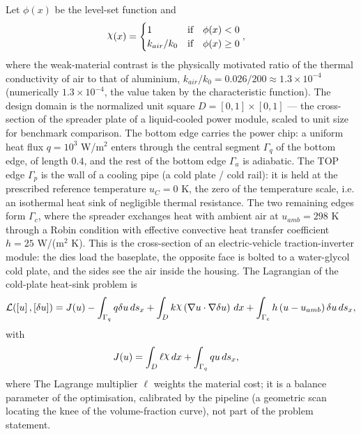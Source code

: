 \documentclass[preview]{standalone}
\let\oldcdot\cdot
\let\cdot\oldcdot
\begin{document}
Let $\phi(x)$ be the level-set function and
 \begin{align*}\raisebox{\depth}{$\chi$}(x) &= \begin{cases} 1 & \mbox{if}\quad \phi(x) < 0 \\ k_{air}/k_0 & \mbox{if}\quad \phi(x)  \ge 0 \end{cases},\end{align*}
where the weak-material contrast is the physically motivated ratio of the thermal conductivity of air to that of aluminium, $k_{air}/k_0 = 0.026/200 \approx 1.3 \times 10^{-4}$ (numerically $1.3 \times 10^{-4}$, the value taken by the characteristic function).
The design domain is the normalized unit square $D = [0,1] \times [0,1]$ — the cross-section of the spreader plate of a liquid-cooled power module, scaled to unit size for benchmark comparison.  The bottom edge carries the power chip: a uniform heat flux $q = 10^{3}$ W/m$^{2}$ enters through the central segment $\Gamma_q$ of the bottom edge, of length $0.4$, and the rest of the bottom edge $\Gamma_a$ is adiabatic.  The TOP edge $\Gamma_p$ is the wall of a cooling pipe (a cold plate / cold rail): it is held at the prescribed reference temperature $u_C = 0$ K, the zero of the temperature scale, i.e. an isothermal heat sink of negligible thermal resistance.  The two remaining edges form $\Gamma_c$, where the spreader exchanges heat with ambient air at $u_{amb} = 298$ K through a Robin condition with effective convective heat transfer coefficient $h = 25$ W/(m$^{2}$ K).  This is the cross-section of an electric-vehicle traction-inverter module: the dies load the baseplate, the opposite face is bolted to a water-glycol cold plate, and the sides see the air inside the housing.
The Lagrangian of the cold-plate heat-sink problem is
\begin{dmath*}
\mathcal L(\left[ u\right],\left[ \delta u\right]) = J(u) -  \int_{\Gamma_q} q \delta u \,ds_x +  \int_{D} k \raisebox{\depth}{$\chi$} \left(  \nabla u  \cdot  \nabla \delta u  \right) \,dx + \int_{\Gamma_c} h \left( u - u_{amb}\right) \delta u \,ds_x ,
\end{dmath*}
with
\begin{align*}
J(u) &=  \int_{D} \ell \raisebox{\depth}{$\chi$} \,dx + \int_{\Gamma_q} q u \,ds_x,
 \end{align*}
where The Lagrange multiplier $\ell$ weights the material cost; it is a balance parameter of the optimisation, calibrated by the pipeline (a geometric scan locating the knee of the volume-fraction curve), not part of the problem statement.
\end{document}
